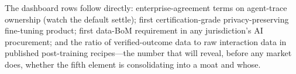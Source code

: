 The dashboard rows follow directly: enterprise-agreement terms on agent-trace ownership (watch the default settle); first certification-grade privacy-preserving fine-tuning product; first data-BoM requirement in any jurisdiction's AI procurement; and the ratio of verified-outcome data to raw interaction data in published post-training recipes---the number that will reveal, before any market does, whether the fifth element is consolidating into a moat and whose.
